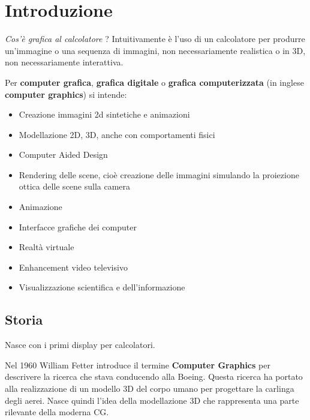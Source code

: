 \documentclass[a4paper, 10pt]{article}
\begin{document}
	\begin{frontespizio}
		\Preambolo{\usepackage{kpfonts}}
		\Scuola{}
		\Titoletto{}
	\end{frontespizio}
	
	\tableofcontents
	
	\newpage
	
	\section{Introduzione}
		\textit{Cos'è grafica al calcolatore} ? Intuitivamente è l'uso di un calcolatore per produrre un'immagine o una sequenza di immagini, non necessariamente realistica o in 3D, non necessariamente interattiva.
		
		\noindent
		Per \textbf{computer grafica}, \textbf{grafica digitale} o \textbf{grafica computerizzata} (in inglese \textbf{computer graphics}) si intende:
		\begin{itemize}
			\item Creazione immagini 2d sintetiche e animazioni
			\item Modellazione 2D, 3D, anche con comportamenti fisici
			\item Computer Aided Design
			\item Rendering delle scene, cioè creazione delle immagini simulando la
			proiezione ottica delle scene sulla camera
			\item Animazione
			\item Interfacce grafiche dei computer
			\item Realtà virtuale
			\item Enhancement video televisivo
			\item Visualizzazione scientifica e dell'informazione
		\end{itemize}
		
	\subsection{Storia}
		Nasce con i primi display per calcolatori. 
		
		\noindent
		Nel 1960 William Fetter introduce il termine \textbf{Computer Graphics} per descrivere la ricerca che stava conducendo alla Boeing. Questa ricerca ha portato alla realizzazione di un modello 3D del corpo umano per progettare la carlinga degli aerei. Nasce quindi l'idea della modellazione 3D che rappresenta una parte rilevante della moderna CG. 
		
\end{document}
